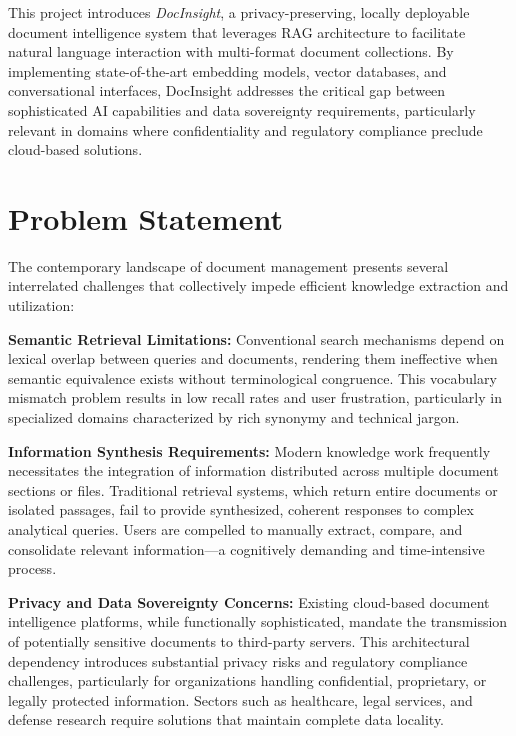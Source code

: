 This project introduces \textit{DocInsight}, a privacy-preserving, locally deployable document intelligence system that leverages RAG architecture to facilitate natural language interaction with multi-format document collections. By implementing state-of-the-art embedding models, vector databases, and conversational interfaces, DocInsight addresses the critical gap between sophisticated AI capabilities and data sovereignty requirements, particularly relevant in domains where confidentiality and regulatory compliance preclude cloud-based solutions.

\section{Problem Statement}

The contemporary landscape of document management presents several interrelated challenges that collectively impede efficient knowledge extraction and utilization:

\textbf{Semantic Retrieval Limitations:} Conventional search mechanisms depend on lexical overlap between queries and documents, rendering them ineffective when semantic equivalence exists without terminological congruence. This vocabulary mismatch problem results in low recall rates and user frustration, particularly in specialized domains characterized by rich synonymy and technical jargon.

\textbf{Information Synthesis Requirements:} Modern knowledge work frequently necessitates the integration of information distributed across multiple document sections or files. Traditional retrieval systems, which return entire documents or isolated passages, fail to provide synthesized, coherent responses to complex analytical queries. Users are compelled to manually extract, compare, and consolidate relevant information---a cognitively demanding and time-intensive process.

\textbf{Privacy and Data Sovereignty Concerns:} Existing cloud-based document intelligence platforms, while functionally sophisticated, mandate the transmission of potentially sensitive documents to third-party servers. This architectural dependency introduces substantial privacy risks and regulatory compliance challenges, particularly for organizations handling confidential, proprietary, or legally protected information. Sectors such as healthcare, legal services, and defense research require solutions that maintain complete data locality.

